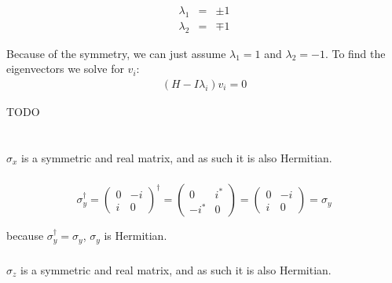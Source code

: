 \documentclass[a4paper,10pt]{hw}
\begin{document}
$$\begin{array}{lcr}
   \lambda_1 & = & \pm1 \\
   \lambda_2 & = & \mp1
\end{array}$$

Because of the symmetry, we can just assume $\lambda_1 = 1$ and $\lambda_2 = -1$.
To find the eigenvectors we solve for $v_i$:
$$\begin{array}{lcr}
   (H - I\lambda_i) v_i = 0
  \end{array}$$
  
TODO

\section{}

\subsection{}

\subsubsection{}

$\sigma_x$ is a symmetric and real matrix, and as such it is also Hermitian.

\subsubsection{}

$$\sigma_y^\dagger
= \begin{pmatrix} 0 & -i \\ i & 0 \end{pmatrix}^\dagger
= \begin{pmatrix} 0 & i^* \\ -i^* & 0 \end{pmatrix}
= \begin{pmatrix} 0 & -i \\ i & 0 \end{pmatrix}
= \sigma_y$$

because $\sigma_y^\dagger = \sigma_y$, $\sigma_y$ is Hermitian.

\subsubsection{}

$\sigma_z$ is a symmetric and real matrix, and as such it is also Hermitian.
\end{document}
